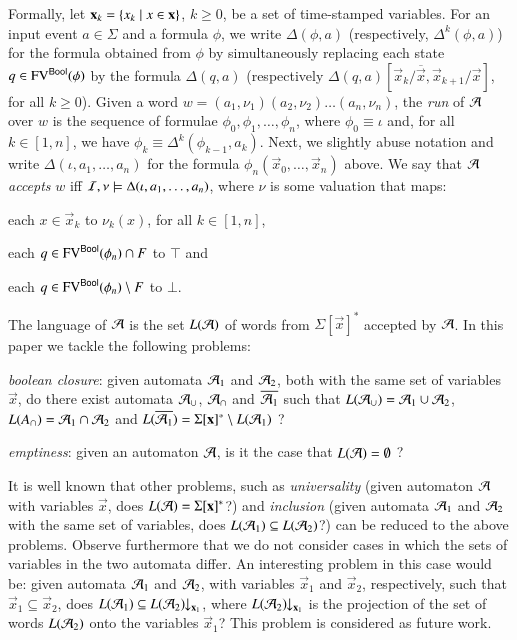\documentclass[10pt,conference,letterpaper,twocolumn]{IEEEtran}
\begin{document}
Formally, let $\mathbf x_k = \left\{ x_k \mid x \in \mathbf x \right\}$, $k\geq0$, be
a set of time-stamped variables. For an input event $a \in \Sigma$ and
a formula $\phi$, we write $\Delta(\phi,a)$ (respectively,
$\Delta^k(\phi,a)$) for the formula obtained from $\phi$ by
simultaneously replacing each state $q \in \mathrm{FV}^{\mathsf{Bool}}(\phi)$ by the
formula $\Delta(q,a)$ (respectively
$\Delta(q,a)[\vec{x}_k/\overline{\vec{x}},\vec{x}_{k+1}/\vec{x}]$, for
all $k\geq0$). Given a word $w = (a_1,\nu_1)(a_2,\nu_2) \ldots
(a_n,\nu_n)$, the \emph{run} of $\mathcal{A}$ over $w$ is the sequence of
formulae $\phi_0,\phi_1,\ldots,\phi_n$, where $\phi_0 \equiv \iota$
and, for all $k\in[1,n]$, we have $\phi_k \equiv
\Delta^k(\phi_{k-1},a_k)$. Next, we slightly abuse notation and write
$\Delta(\iota,a_1,\ldots,a_n)$ for the formula
$\phi_n(\vec{x}_0,\ldots,\vec{x}_n)$ above. We say that $\mathcal{A}$
\emph{accepts} $w$ iff $\mathcal{I},\nu \models \Delta(\iota,a_1,\ldots,a_n)$,
where $\nu$ is some valuation that maps:\begin{inparaenum}[(1)]
%
\item each $x \in \vec{x}_k$ to $\nu_k(x)$, for all $k\in[1,n]$, 
%
\item each $q \in \mathrm{FV}^{\mathsf{Bool}}(\phi_n) \cap F$ to $\top$ and 
%
\item each $q \in \mathrm{FV}^{\mathsf{Bool}}(\phi_n) \setminus F$ to $\bot$.
\end{inparaenum}
The language of $\mathcal{A}$ is the set $L(\mathcal{A})$ of words from
$\Sigma[\vec{x}]^*$ accepted by $\mathcal{A}$.
%
In this paper we tackle the following problems: \begin{compactenum}
\item \emph{boolean closure}: given automata $\mathcal{A}_1$ and $\mathcal{A}_2$, both
  with the same set of variables $\vec{x}$, do there exist automata
  $\mathcal{A}_\cup$, $\mathcal{A}_\cap$ and $\overline{\mathcal{A}_1}$ such that $L(\mathcal{A}_\cup) =
  \mathcal{A}_1 \cup \mathcal{A}_2$, $L(A_\cap) = \mathcal{A}_1 \cap \mathcal{A}_2$ and
  $L(\overline{\mathcal{A}_1}) = \Sigma[\mathbf x]^* \setminus L(\mathcal{A}_1)$ ?
%
\item \emph{emptiness}: given an automaton $\mathcal{A}$, is it the case that
  $L(\mathcal{A}) = \emptyset$ ?
\end{compactenum}

It is well known that other problems, such as \emph{universality}
(given automaton $\mathcal{A}$ with variables $\vec{x}$, does $L(\mathcal{A}) =
\Sigma[\mathbf x]^*$?) and \emph{inclusion} (given automata $\mathcal{A}_1$ and
$\mathcal{A}_2$ with the same set of variables, does $L(\mathcal{A}_1) \subseteq
L(\mathcal{A}_2)$?) can be reduced to the above problems. Observe furthermore
that we do not consider cases in which the sets of variables in the
two automata differ. An interesting problem in this case would be: given
automata $\mathcal{A}_1$ and $\mathcal{A}_2$, with variables $\vec{x}_1$ and
$\vec{x}_2$, respectively, such that $\vec{x}_1 \subseteq \vec{x}_2$,
does $L(\mathcal{A}_1) \subseteq {L(\mathcal{A}_2)}\!\!\downarrow_{{\mathbf x_1}}$, where
${L(\mathcal{A}_2)}\!\!\downarrow_{{\mathbf x_1}}$ is the projection of the set of words
$L(\mathcal{A}_2)$ onto the variables $\vec{x}_1$? This problem is considered
as future work.
\end{document}
